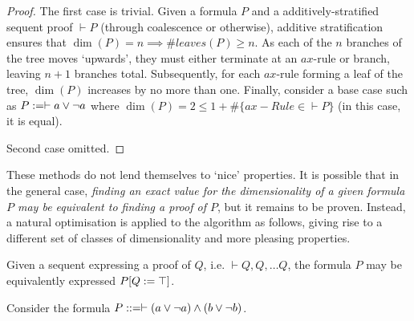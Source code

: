     \begin{proof}
        The first case is trivial.
        Given a formula $P$ and a additively-stratified sequent proof $\vdash P$ (through coalescence or otherwise), additive stratification ensures that $\dim(P) = n \implies \#leaves(P) \geq n$.
        As each of the $n$ branches of the tree moves `upwards', they must either terminate at an $ax$-rule or branch, leaving $n + 1$ branches total.
        Subsequently, for each $ax$-rule forming a leaf of the tree, $\dim(P)$ increases by no more than one.
        Finally, consider a base case such as $P := \vdash a \vee \neg a$ where $\dim(P) = 2 \leq 1 + \#\{ax-Rule \in \vdash P\}$ (in this case, it is equal).
        
        Second case omitted. %
    \end{proof}


    \begin{remark*}
        These methods do not lend themselves to `nice' properties.
        It is possible that in the general case, \textit{finding an exact value for the dimensionality of a given formula $P$ may be equivalent to finding a proof of $P$}, but it remains to be proven.
        Instead, a natural optimisation is applied to the algorithm as follows, giving rise to a different set of classes of dimensionality and more pleasing properties.
    \end{remark*} 

    \begin{definition}
         Given a sequent expressing a proof of $Q$, i.e. $\vdash Q, Q, \ldots Q$, the formula $P$ may be equivalently expressed $P[Q := \top]$.
    \end{definition}

    \begin{example}
        Consider the formula $P ::= \vdash (a \vee \neg a) \wedge (b \vee \neg b)$. 
    \end{example}
